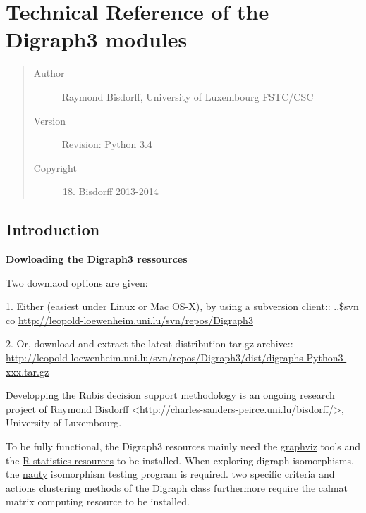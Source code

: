 \documentclass[letterpaper,10pt,english]{sphinxmanual}
\begin{document}
\section{Technical Reference of the Digraph3 modules}
\label{techDoc::doc}\label{techDoc:technical-reference-of-the-digraph3-modules}\begin{quote}\begin{description}
\item[{Author}] \leavevmode
Raymond Bisdorff, University of Luxembourg FSTC/CSC

\item[{Version}] \leavevmode
Revision: Python 3.4

\item[{Copyright}] \leavevmode\begin{enumerate}
\setcounter{enumi}{17}
\item {} 
Bisdorff 2013-2014

\end{enumerate}

\end{description}\end{quote}


\subsection{Introduction}
\label{techDoc:introduction}\label{techDoc:technical-label}
\textbf{Dowloading the Digraph3 ressources}

Two downlaod options are given:

1. Either (easiest under Linux or Mac OS-X), by using a subversion client::
..\$svn co \href{http://leopold-loewenheim.uni.lu/svn/repos/Digraph3}{http://leopold-loewenheim.uni.lu/svn/repos/Digraph3}

2. Or, download and extract the latest distribution tar.gz archive::
\href{http://leopold-loewenheim.uni.lu/svn/repos/Digraph3/dist/digraphs-Python3-xxx.tar.gz}{http://leopold-loewenheim.uni.lu/svn/repos/Digraph3/dist/digraphs-Python3-xxx.tar.gz}

Developping the Rubis decision support methodology is an ongoing research project of Raymond Bisdorff \textless{}\href{http://charles-sanders-peirce.uni.lu/bisdorff/}{http://charles-sanders-peirce.uni.lu/bisdorff/}\textgreater{}, University of Luxembourg.

To be fully functional, the Digraph3 resources mainly need the \href{http://graphviz.org}{graphviz} tools and the \href{http://www.r-project.org}{R statistics resources} to be installed. When exploring digraph isomorphisms, the \href{http://www.cs.sunysb.edu/~algorith/implement/nauty/implement.shtml}{nauty} isomorphism testing program is required. two specific criteria and actions clustering methods of the Digraph class furthermore require the \href{http://leopold-loewenheim.uni.lu/svn/repos/Calmat/}{calmat} matrix computing resource to be installed.
\end{document}

